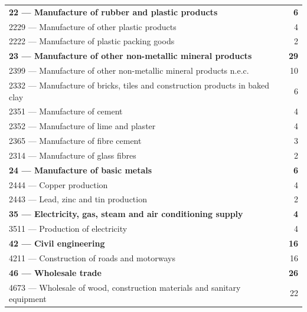 \begin{longtable}{lr}
\addlinespace[2pt]\textbf{22 --- Manufacture of rubber and plastic products} & \textbf{6} \\
\hspace{1em}2229 --- Manufacture of other plastic products & 4 \\
\hspace{1em}2222 --- Manufacture of plastic packing goods & 2 \\
\addlinespace[2pt]\textbf{23 --- Manufacture of other non-metallic mineral products} & \textbf{29} \\
\hspace{1em}2399 --- Manufacture of other non-metallic mineral products n.e.c. & 10 \\
\hspace{1em}2332 --- Manufacture of bricks, tiles and construction products in baked clay & 6 \\
\hspace{1em}2351 --- Manufacture of cement & 4 \\
\hspace{1em}2352 --- Manufacture of lime and plaster & 4 \\
\hspace{1em}2365 --- Manufacture of fibre cement & 3 \\
\hspace{1em}2314 --- Manufacture of glass fibres & 2 \\
\addlinespace[2pt]\textbf{24 --- Manufacture of basic metals} & \textbf{6} \\
\hspace{1em}2444 --- Copper production & 4 \\
\hspace{1em}2443 --- Lead, zinc and tin production & 2 \\
\addlinespace[2pt]\textbf{35 --- Electricity, gas, steam and air conditioning supply} & \textbf{4} \\
\hspace{1em}3511 --- Production of electricity & 4 \\
\addlinespace[2pt]\textbf{42 --- Civil engineering} & \textbf{16} \\
\hspace{1em}4211 --- Construction of roads and motorways & 16 \\
\addlinespace[2pt]\textbf{46 --- Wholesale trade} & \textbf{26} \\
\hspace{1em}4673 --- Wholesale of wood, construction materials and sanitary equipment & 22 \\

\end{longtable}
